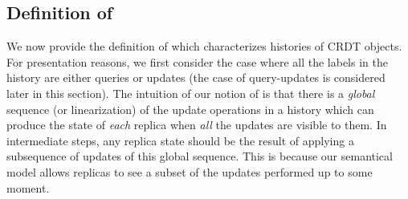 
\subsection{Definition of \CRDTLin{}}
\label{subsec:definition of distributed linearizability}

We now provide the definition of \crdtlin{} which characterizes histories of CRDT objects.
For presentation reasons, we first consider the case where all the labels in the history are
either queries or updates (the case of query-updates is considered later in this section).
%
%
%
The intuition of our notion of \crdtlin{} is that there is a \emph{global} sequence
(or linearization) of the update operations in a history which can
produce the state of \emph{each} replica when \emph{all} the updates are visible to them.
In intermediate steps, any replica state should be the result of applying a subsequence of updates
of this global sequence. This is because our semantical model allows replicas to see a subset of the updates
performed up to some moment.
